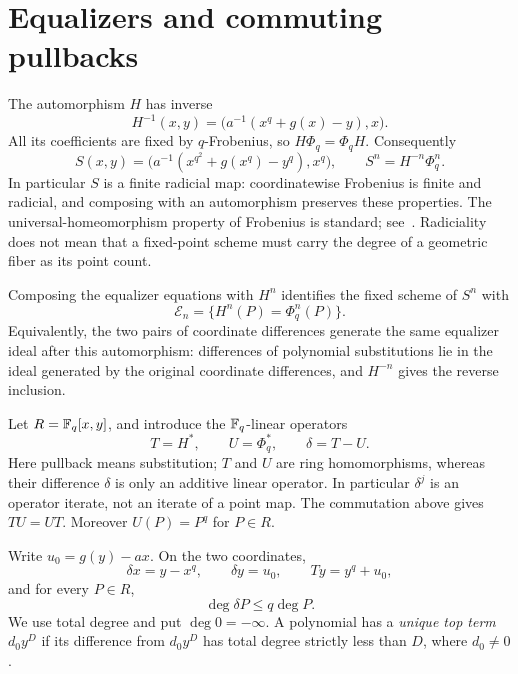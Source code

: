 \section{Equalizers and commuting pullbacks}\label{sec:setup}

The automorphism $H$ has inverse
\[
 H^{-1}(x,y)=\bigl(a^{-1}(x^q+g(x)-y),x\bigr).
\]
All its coefficients are fixed by $q$-Frobenius, so $H\Phi_q=\Phi_q H$.
Consequently
\begin{equation}\label{eq:explicit-S}
 S(x,y)=\bigl(a^{-1}(x^{q^2}+g(x^q)-y^q),x^q\bigr),
 \qquad S^n=H^{-n}\Phi_q^n.
\end{equation}
In particular $S$ is a finite radicial map: coordinatewise Frobenius
is finite and radicial, and composing with an automorphism preserves
these properties. The universal-homeomorphism property of Frobenius
is standard; see~\cite[Tag 0CC8]{StacksFrobenius}. Radiciality does
not mean that a fixed-point scheme must carry the degree of a
geometric fiber as its point count.

Composing the equalizer equations with $H^n$ identifies the fixed
scheme of $S^n$ with
\begin{equation}\label{eq:equalizer}
 \mathcal E_n=\{H^n(P)=\Phi_q^n(P)\}.
\end{equation}
Equivalently, the two pairs of coordinate differences generate the
same equalizer ideal after this automorphism: differences of
polynomial substitutions lie in the ideal generated by the original
coordinate differences, and $H^{-n}$ gives the reverse inclusion.

Let $R=\mathbb F_q[x,y]$, and introduce the $\mathbb F_q$-linear operators
\begin{equation}\label{eq:operators}
 T=H^*,\qquad U=\Phi_q^*,\qquad \delta=T-U.
\end{equation}
Here pullback means substitution; $T$ and $U$ are ring homomorphisms,
whereas their difference $\delta$ is only an additive linear
operator. In particular $\delta^j$ is an operator iterate, not an
iterate of a point map. The commutation above gives $TU=UT$.
Moreover $U(P)=P^q$ for $P\in R$.

Write $u_0=g(y)-ax$. On the two coordinates,
\begin{equation}\label{eq:delta-coordinates}
 \delta x=y-x^q,\qquad \delta y=u_0,
 \qquad Ty=y^q+u_0,
\end{equation}
and for every $P\in R$,
\begin{equation}\label{eq:ordinary-degree-bound}
 \deg\delta P\le q\deg P.
\end{equation}
We use total degree and put $\deg0=-\infty$. A polynomial has a
\emph{unique top term} $d_0y^D$ if its difference from $d_0y^D$ has
total degree strictly less than $D$, where $d_0\ne0$.

